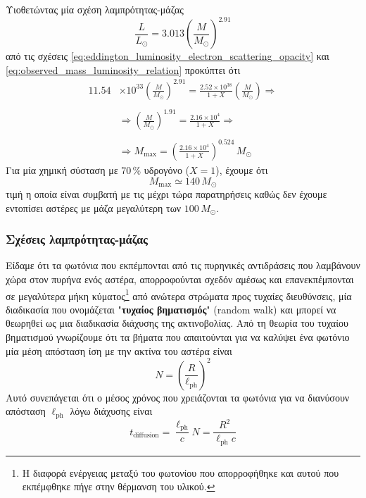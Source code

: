 Υιοθετώντας μία σχέση λαμπρότητας-μάζας
\begin{equation}
    \label{eq:observed_mass_luminosity_relation}
    \frac{L}{L_\odot} = 3.013 \left( \frac{M}{M_\odot} \right)^{2.91}
\end{equation}
από τις σχέσεις \eqref{eq:eddington_luminosity_electron_scattering_opacity} και \eqref{eq:observed_mass_luminosity_relation} προκύπτει ότι
\begin{align*}
    11.54 &\times 10^{33} \left( \frac{M}{M_\odot} \right)^{2.91} = \frac{2.52 \times 10^{38}}{1+X} \left( \frac{M}{M_\odot} \right) \Rightarrow \\\\
    &\Rightarrow \left( \frac{M}{M_\odot} \right)^{1.91} = \frac{2.16 \times 10^4}{1+X} \Rightarrow \\\\
    &\Rightarrow M_{\text{max}} = \left(\frac{2.16 \times 10^4}{1+X} \right)^{0.524} \,M_\odot
\end{align*}
Για μία χημική σύσταση με 70\,\% υδρογόνο ($X=1$), έχουμε ότι
\begin{equation}
    M_{\text{max}} \simeq 140 \,M_{\odot}
\end{equation}
τιμή η οποία είναι συμβατή με τις μέχρι τώρα παρατηρήσεις καθώς δεν έχουμε εντοπίσει αστέρες με μάζα μεγαλύτερη των $100 \,M_\odot$.
\subsubsection{Σχέσεις λαμπρότητας-μάζας}
Είδαμε ότι τα φωτόνια που εκπέμπονται από τις πυρηνικές αντιδράσεις που λαμβάνουν χώρα στον πυρήνα ενός αστέρα, απορροφούνται σχεδόν αμέσως και επανεκπέμπονται σε μεγαλύτερα μήκη κύματος\footnote{ Η διαφορά ενέργειας μεταξύ του φωτονίου που απορροφήθηκε και αυτού που εκπέμφθηκε πήγε στην θέρμανση του υλικού.} από ανώτερα στρώματα προς τυχαίες διευθύνσεις, μία διαδικασία που ονομάζεται "\textbf{τυχαίος βηματισμός}" (random walk) και μπορεί να θεωρηθεί ως μια διαδικασία διάχυσης της ακτινοβολίας. Από τη θεωρία του τυχαίου βηματισμού γνωρίζουμε ότι τα βήματα που απαιτούνται για να καλύψει ένα φωτόνιο μία μέση απόσταση ίση με την ακτίνα του αστέρα είναι
\begin{equation}
    \label{eq:random_walk_steps}
    N = \left( \frac{R}{\ell_{\text{ph}}} \right)^2
\end{equation}
Αυτό συνεπάγεται ότι ο μέσος χρόνος που χρειάζονται τα φωτόνια για να διανύσουν απόσταση $\ell_{\text{ph}}$ λόγω διάχυσης είναι
\begin{equation}
    \label{eq:diffusion_time}
    t_{\text{diffusion}} = \frac{\ell_{\text{ph}}}{c} N = \frac{R^2}{\ell_{\text{ph}} c}
\end{equation}

